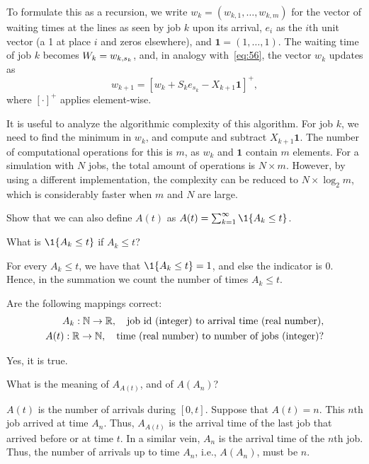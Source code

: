 To formulate this as a recursion, we write $w_k = (w_{k,1}, \ldots, w_{k,m})$ for the vector of waiting times at the lines as seen by job $k$ upon its arrival, $e_i$ as the $i$th unit vector (a 1 at place $i$ and zeros elsewhere), and $\mathbf{1} = (1,\ldots, 1)$.
The waiting time of job $k$ becomes $W_k = w_{k,s_k}$, and, in analogy with~\cref{eq:56}, the vector $w_k$ updates as
\begin{equation*}
  w_{k+1} = [w_k + S_k e_{s_k} - X_{k+1}\mathbf{1}]^+,
\end{equation*}
where $[\cdot]^+$ applies element-wise. 

It is useful to analyze the algorithmic complexity of this algorithm.
For job $k$, we need to find the minimum in $w_k$, and compute and subtract $X_{k+1}\mathbf{1}$.
The number of computational operations for this is $m$, as $w_k$ and $\mathbf{1}$ contain $m$ elements.
For a simulation with $N$ jobs, the total amount of operations is $N \times m$.
However, by using a different implementation, the complexity can be reduced to $N\times \log_2{m}$, which is considerably faster when $m$ and $N$ are large.



\begin{exercise}\label{ex:20} 
Show that we can also define $A(t)$ as $A(t) = \sum_{k=1}^\infty \1{A_k \leq t}$.
\begin{hint}
  What is $\1{A_k \leq t}$ if $A_k \leq t$? 
\end{hint}
\begin{solution}
For every $A_k \leq t$, we have that $\1{A_k \leq t} = 1$, and else the indicator is $0$. Hence, in the summation we count the number of times $A_k \leq t$. 
\end{solution}
\end{exercise}

\begin{exercise}\label{ex:60}
Are the following mappings correct:
\begin{align*}
 A_k : \mathbb{N} \to \mathbb{R}, \quad{\text{job id (integer) to arrival time (real number)}}, \\
 A(t) : \mathbb{R}\to \mathbb{N}, \quad{\text{time (real number) to number of jobs (integer)}}?
\end{align*}
\begin{solution}
  Yes, it is true.
\end{solution}
\end{exercise}

\begin{exercise}\label{ex:61}
 What is the meaning of $A_{A(t)}$, and of $A(A_n)$?
\begin{solution}
 $A(t)$ is the number of arrivals during $[0,t]$. Suppose that
 $A(t) = n$. This $n$th job arrived at time $A_n$. Thus, $A_{A(t)}$
 is the arrival time of the last job that arrived before or at time
 $t$. In a similar vein, $A_n$ is the arrival time of the $n$th
 job. Thus, the number of arrivals up to time $A_n$, i.e., $A(A_n)$,
 must be $n$.
\end{solution}
\end{exercise}

